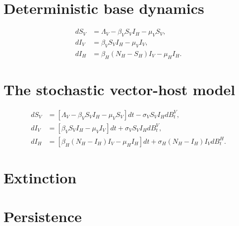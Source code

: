\documentclass{amsart}
\theoremstyle{plain}
\theoremstyle{definition}
\begin{document}
    \section{Deterministic base dynamics}
       \begin{equation}
           \begin{aligned}
               d S_V &= \Lambda_V - \beta_V S_V I_H - \mu_V S_V, \\
               d I_V &= \beta_V S_V I_H - \mu_V I_V, \\
               d I_H &= \beta_H (N_H - S_H) I_V - \mu_H I_H.
           \end{aligned}
       \end{equation}
%
%
%
    \section{The stochastic vector-host model}
       \begin{equation} \label{eqn:sto_vector_host}
            \begin{aligned}
                d S_V &= 
                    \left [
                        \Lambda_V - \beta_V S_V I_H - \mu_V S_V 
                    \right ] dt
                    - \sigma_V S_V I_H dB_t^V,
                    \\
                d I_V &= 
                    \left [
                       \beta_V S_V I_H - \mu_V I_V 
                    \right ]
                    dt 
                    + \sigma_V S_V I_H dB_t^V,
                    \\
                d I_H &= 
                    \left [
                        \beta_H (N_H - I_H) I_V - \mu_H I_H
                    \right ] dt
                    + \sigma_H (N_H - I_H) I_V d B^H_t .
           \end{aligned}
       \end{equation}
%
    \section{Extinction}
        
    \section{Persistence}
        
%
%
%
%
%
%
%
%
\end{document}
